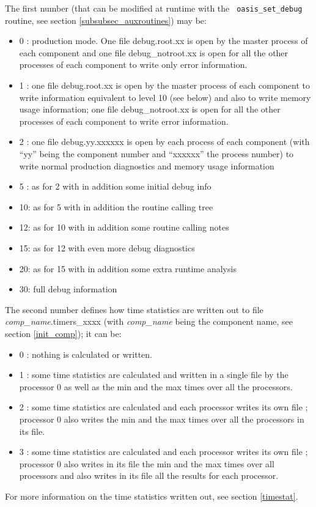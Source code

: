 \begin{itemize}
  The first number (that can be modified at runtime with the {\tt
    oasis\_set\_debug} routine, see section
  \ref{subsubsec_auxroutines}) may be:
  \begin{itemize}
  \item 0 : production mode. One file debug.root.xx is open by the master process of
    each component and one file debug\_notroot.xx is open for all the
    other processes of each component to write only error information.
  \item 1 : one file debug.root.xx is open by the master process of
    each component to write information equivalent to level 10 (see
    below) and also to write memory usage information;
    one file debug\_notroot.xx is open for all the other
    processes of each component to write error information.
  \item 2 : one file debug.yy.xxxxxx is open by each process of each
    component (with ``yy” being the component number and ``xxxxxx” the process number)
    to write normal production diagnostics and memory usage information
  \item 5 : as for 2 with in addition some initial debug info
  \item 10: as for 5 with in addition the routine calling tree
  \item 12: as for 10 with in addition some routine calling notes
  \item 15: as for 12 with even more debug diagnostics
  \item 20: as for 15 with in addition some extra runtime analysis
  \item 30: full debug information
  \end{itemize}
  The second number defines how time statistics are written out to
  file {\it comp\_name}.timers\_xxxx (with {\it comp\_name} being the component name, see section \ref{init_comp}); it can be:
  \begin{itemize}
  \item 0 : nothing is calculated or written.
  \item 1 : some time statistics are calculated and written in a
    single file by the processor 0 as well as the min and the max
    times over all the processors.
  \item 2 : some time statistics are calculated and each processor
    writes its own file ; processor 0 also writes the min and the max
    times over all the processors in its file.
  \item 3 : some time statistics are calculated and each processor
    writes its own file ; processor 0 also writes in its file the min
    and the max times over all processors and also writes in its file
    all the results for each processor.
  \end{itemize}
 For more information on the time statistics written out, see section
  \ref{timestat}.


\end{itemize}
